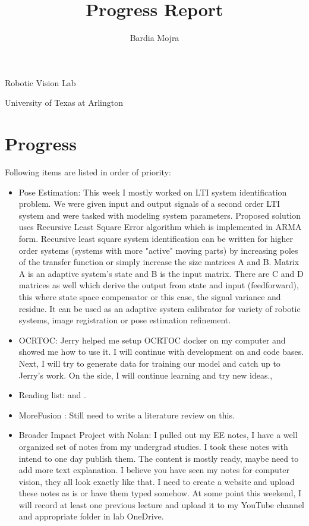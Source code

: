 \documentclass[11pt]{article}
\title{Progress Report}
\author{Bardia Mojra}
\begin{document}
\maketitle
\thispagestyle{empty}

\begin{center}
	\bigskip
	\bigskip
	Robotic Vision Lab

	University of Texas at Arlington
\end{center}

\newpage

\section{Progress}
Following items are listed in order of priority:
\begin{itemize}

	\item Pose Estimation: This week I mostly worked on LTI system identification problem. We were given input and output signals of a second order LTI system and were tasked with modeling system parameters. Proposed solution uses Recursive Least Square Error algorithm which is implemented in ARMA form. Recursive least square system identification can be written for higher order systems (systems with more "active" moving parts) by increasing poles of the transfer function or simply increase the size matrices A and B. Matrix A is an adaptive system's state and B is the input matrix. There are C and D matrices as well which derive the output from state and input (feedforward), this where state space compensator or this case, the signal variance and residue. It can be used as an adaptive system calibrator for variety of robotic systems, image registration or pose estimation refinement.

	\item OCRTOC: Jerry helped me setup OCRTOC docker on my computer and showed me how to use it. I will continue with development on \cite{Dope} and \cite{MoreFusion} code bases. Next, I will try to generate data for training our model and catch up to Jerry's work. On the side, I will continue learning and try new ideas.,

	\item Reading list: \cite{lampinen2001bayesian} and \cite{li2019survey}.

	\item MoreFusion \cite{MoreFusion}: Still need to write a literature review on this.
	\item Broader Impact Project with Nolan: I pulled out my EE notes, I have a well organized set of notes from my undergrad studies. I took these notes with intend to one day publish them. The content is mostly ready, maybe need to add more text explanation. I believe you have seen my notes for computer vision, they all look exactly like that. I need to create a website and upload these notes as is or have them typed somehow. At some point this weekend, I will record at least one previous lecture and upload it to my YouTube channel and appropriate folder in lab OneDrive.


\end{itemize}
\end{document}
